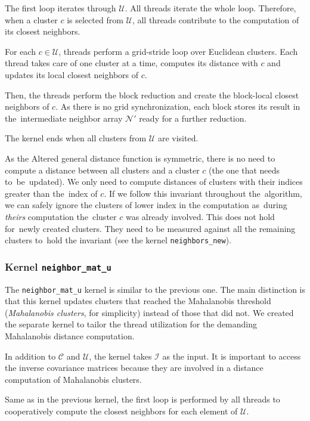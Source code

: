 The first loop iterates through $\mathcal{U}$. All threads iterate the whole loop. Therefore, when a cluster $c$ is selected  from $\mathcal{U}$, all threads contribute to the computation of its closest neighbors.

For each $c \in \mathcal{U}$, threads perform a grid-stride loop over Euclidean clusters. Each thread takes care of one cluster at a time, computes its distance with $c$ and updates its local closest neighbors of $c$.

Then, the threads perform the block reduction and create the block-local closest neighbors of $c$. As there is no grid synchronization, each block stores its result in the~intermediate neighbor array $\mathcal{N}'$ ready for a further reduction.

The kernel ends when all clusters from $\mathcal{U}$ are visited.

\begin{rem}
	As the Altered general distance function is symmetric, there is no need to compute a distance between all clusters and a cluster $c$ (the one that needs to~be~updated). We only need to compute distances of clusters with their indices greater than the~index of $c$. If we follow this invariant throughout the~algorithm, we can safely ignore the clusters of lower index in the computation as~during \emph{theirs} computation the~cluster $c$ was already involved. This does not hold for~newly created clusters. They need to be measured against all the remaining clusters to~hold the invariant (see the kernel \texttt{neighbors\_new}).
\end{rem}

\subsubsection{Kernel \texttt{neighbor\_mat\_u}} The \texttt{neighbor\_mat\_u} kernel is similar to the previous one. The main distinction is that this kernel updates clusters that reached the Mahalanobis threshold (\emph{Mahalanobis clusters}, for simplicity) instead of those that did not. We created the separate kernel to tailor the thread utilization for the demanding Mahalanobis distance computation.

In addition to $\mathcal{C}$ and $\mathcal{U}$, the kernel takes $\mathcal{I}$ as the input. It is important to access the inverse covariance matrices because they are involved in a distance computation of Mahalanobis clusters. 

Same as in the previous kernel, the first loop is performed by all threads to cooperatively compute the closest neighbors for each element of $\mathcal{U}$.


